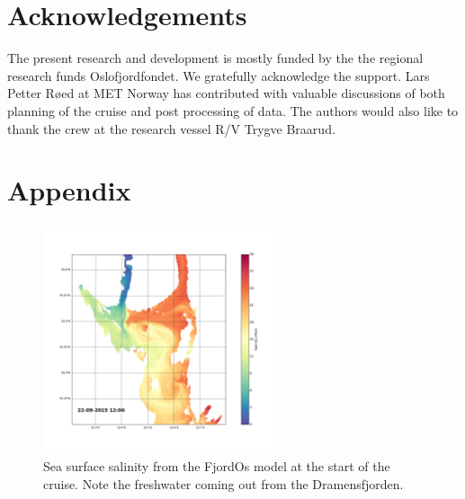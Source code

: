 \documentclass[12pt,a4paper,english]{article}
\begin{document}
\clearpage
\section*{\hspace{17mm}Acknowledgements}
The present research and development is mostly funded by the the regional research funds Oslofjordfondet. We gratefully acknowledge the support. Lars Petter R\o ed at MET Norway has contributed with valuable discussions of both planning of the cruise and post processing of data. The authors would also like to thank the crew at the research vessel R/V Trygve Braarud. 

\clearpage
\section*{\hspace{17mm}Appendix}

\begin{figure}[ht]
\centerline{
\includegraphics*[width=0.6\textwidth]{Python/salthold_96}}
\caption{\small
Sea surface salinity from the FjordOs model at the start of the cruise. Note the freshwater coming out from the Dramensfjorden.
}
\label{fig:Salinity1}
\end{figure}
\end{document}
